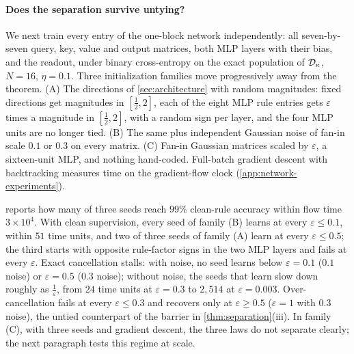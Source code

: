 \begin{table}[t]
\centering\small
\caption{\textbf{Correct computation from clean and corrupted reasoning supervision.} The clean control has no errors; both noisy regimes have local error rate $\eta=0.2$.
The same block parameters train on all $N$ selected positions. Times reach source attention $\tfrac{1}{2}$ on every prefix; the final column compares structured errors with clean supervision.}
\label{tab:causal-flow}

\end{table}

\paragraph{Does the separation survive untying?}
We next train every entry of the one-block network independently: all seven-by-seven query, key, value and output matrices,
both MLP layers with their bias, and the readout, under binary cross-entropy on the exact population of $\mathcal D_{\kappa}$, $N=16$, $\eta=0.1$.
Three initialization families move progressively away from the theorem.
(A) The directions of \cref{sec:architecture} with random magnitudes: fixed directions get magnitudes in $[\tfrac{1}{2},2]$,
each of the eight MLP rule entries gets $\varepsilon$ times a magnitude in $[\tfrac{1}{2},2]$, with a random sign per layer, and the four MLP units are no longer tied.
(B) The same plus independent Gaussian noise of fan-in scale $0.1$ or $0.3$ on every matrix.
(C) Fan-in Gaussian matrices scaled by $\varepsilon$, a sixteen-unit MLP, and nothing hand-coded.
Full-batch gradient descent with backtracking measures time on the gradient-flow clock (\cref{app:network-experiments}).

 reports how many of three seeds reach $99\%$ clean-rule accuracy within flow time $3\times10^4$.
With clean supervision, every seed of family (B) learns at every $\varepsilon\le0.1$, within $51$ time units,
and two of three seeds of family (A) learn at every $\varepsilon\le0.5$; the third starts with opposite rule-factor signs in the two MLP layers and fails at every $\varepsilon$.
Exact cancellation stalls: with noise, no seed learns below $\varepsilon=0.1$ ($0.1$ noise) or $\varepsilon=0.5$ ($0.3$ noise);
without noise, the seeds that learn slow down roughly as $\tfrac{1}{\varepsilon}$, from $24$ time units at $\varepsilon=0.3$ to $2{,}514$ at $\varepsilon=0.003$.
Over-cancellation fails at every $\varepsilon\le0.3$ and recovers only at $\varepsilon\ge0.5$ ($\varepsilon=1$ with $0.3$ noise),
the untied counterpart of the barrier in \cref{thm:separation}(iii).
In family (C), with three seeds and gradient descent, the three laws do not separate clearly; the next paragraph tests this regime at scale.


